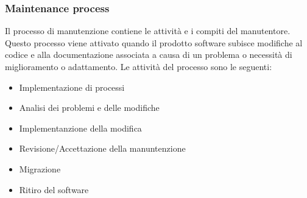 \subsubsection{Maintenance process}
Il processo di manutenzione contiene le attività e i compiti del manutentore. Questo processo viene attivato quando il prodotto software subisce modifiche al codice e alla documentazione associata a causa di un problema o necessità di miglioramento o adattamento.
Le attività del processo sono le seguenti:
\begin{itemize}
\item Implementazione di processi
\item Analisi dei problemi e delle modifiche
\item Implementanzione della modifica
\item Revisione/Accettazione della manuntenzione
\item Migrazione
\item Ritiro del software
\end{itemize}


